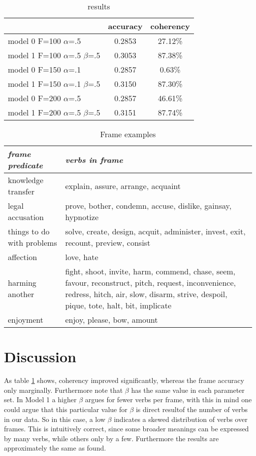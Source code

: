 \documentclass{article} %
\begin{document}
 \begin{table}[h]
\centering
\begin{tabular}{|l||c|c|}
  \hline
  &accuracy&coherency\\
  \hline
  \hline
  model 0 F=100 $\alpha$=.5&0.2853 & 27.12\%  \\
  \hline
  model 1 F=100 $\alpha$=.5 $\beta$=.5& 0.3053 & 87.38\%  \\
  \hline
  model 0 F=150 $\alpha$=.1&0.2857 & 0.63\%  \\
  \hline
  model 1 F=150 $\alpha$=.1 $\beta$=.5& 0.3150 & 87.30\%  \\
  \hline
  model 0 F=200 $\alpha$=.5&0.2857 & 46.61\%  \\
  \hline
  model 1 F=200 $\alpha$=.5 $\beta$=.5&  0.3151& 87.74\%  \\
  \hline
\end{tabular}
\caption{results}
\label{results}
\end{table}

\begin{table}
\begin{tabular}{|p{}|p{}|}
  \hline
  \textit{frame predicate} & \textit{verbs in frame}\\
  \hline
  \hline
  knowledge transfer & explain, assure, arrange, acquaint\\
  \hline
  legal accusation & prove, bother, condemn, accuse, dislike, gainsay, hypnotize\\
  \hline
  things to do with problems & solve, create, design, acquit, administer, invest, exit, recount, preview, consist\\
  \hline
  affection & love, hate\\
  \hline
  harming another &fight, shoot, invite, harm, commend, chase, seem, favour, reconstruct, pitch, request, inconvenience, redress, hitch, air, slow, disarm, strive, despoil, pique, tote, halt, bit, implicate\\
  \hline
  enjoyment & enjoy, please, bow, amount\\
  \hline
\end{tabular}
\caption{Frame examples}
\label{exframes}
\end{table}

\section{Discussion}
As table \ref{results} shows, coherency  improved significantly, whereas the frame accuracy only marginally. Furthermore note that $\beta$ has the same value in each parameter set. In Model 1 a higher $\beta$ argues for fewer verbs per frame, with this in mind one could argue that this particular value for $\beta$ is direct resultof the number of verbs in our data. So in this case, a low $\beta$ indicates a skewed distribution of verbs over frames. This is intuitively correct, since some broader meanings can be expressed by many verbs, while others only by a few. Furthermore the results are approximately the same as \citeauthor{oconnor2013} found.
\end{document}
